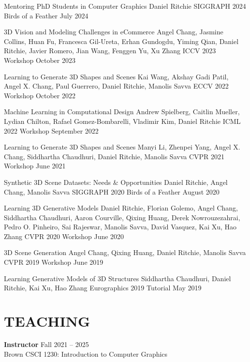 \documentclass[line,margin]{res}
\begin{document}
\begin{resume}
\workshop
{Mentoring PhD Students in Computer Graphics}
{Daniel Ritchie}
{SIGGRAPH 2024 Birds of a Feather}
{July 2024}

\workshop
{3D Vision and Modeling Challenges in eCommerce}
{Angel Chang, Jasmine Collins, Huan Fu, Francesca Gil-Ureta, Erhan Gundogdu, Yiming Qian, Daniel Ritchie, Javier Romero, Jian Wang, Fenggen Yu, Xu Zhang}
{ICCV 2023 Workshop}
{October 2023}

\workshop
{Learning to Generate 3D Shapes and Scenes}
{Kai Wang, Akshay Gadi Patil, Angel X. Chang, Paul Guerrero, Daniel Ritchie, Manolis Savva}
{ECCV 2022 Workshop}
{October 2022}

\workshop
{Machine Learning in Computational Design}
{Andrew Spielberg, Caitlin Mueller, Lydian Chilton, Rafael Gomez-Bombarelli, Vladimir Kim, Daniel Ritchie}
{ICML 2022 Workshop}
{September 2022}

\workshop
{Learning to Generate 3D Shapes and Scenes}
{Manyi Li, Zhenpei Yang, Angel X. Chang, Siddhartha Chaudhuri, Daniel Ritchie, Manolis Savva}
{CVPR 2021 Workshop}
{June 2021}

\workshop
{Synthetic 3D Scene Datasets: Needs \& Opportunities}
{Daniel Ritchie, Angel Chang, Manolis Savva}
{SIGGRAPH 2020 Birds of a Feather}
{August 2020}

\workshop
{Learning 3D Generative Models}
{Daniel Ritchie, Florian Golemo, Angel Chang, Siddhartha Chaudhuri, Aaron Courville, Qixing Huang, Derek Nowrouzezahrai, Pedro O. Pinheiro, Sai Rajeswar, Manolis Savva, David Vasquez, Kai Xu, Hao Zhang}
{CVPR 2020 Workshop}
{June 2020}

\workshop
{3D Scene Generation}
{Angel Chang, Qixing Huang, Daniel Ritchie, Manolis Savva}
{CVPR 2019 Workshop}
{June 2019}

\tutorial
{Learning Generative Models of 3D Structures}
{Siddhartha Chaudhuri, Daniel Ritchie, Kai Xu, Hao Zhang}
{Eurographics 2019 Tutorial}
{May 2019}


\section{TEACHING}

\newcommand{\teach}[3] {
	\textbf{#1} \hfill #3\\
	#2
}

\teach
{Instructor}
{Brown CSCI 1230: Introduction to Computer Graphics}
{Fall 2021 -- 2025}


\end{resume}
\end{document}
